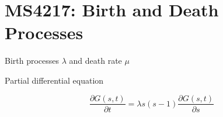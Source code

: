\section{MS4217: Birth and Death Processes}

Birth processes $\lambda$  and death rate $\mu$

Partial differential equation

\[\frac{\partial G(s,t)}{\partial t}=\lambda s(s-1)\frac{\partial G(s,t)}{\partial s}\]
